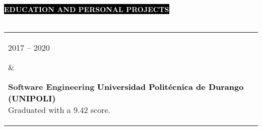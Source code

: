 \documentclass[10pt,A4]{article}
\makeatletter
\newcounter{a}
\newcounter{b}
\newcounter{c}
\newcommand{\cvsection}[1] {
	\textcolor{white}{\MakeUppercase{\textbf{#1}}}
}
\newcommand{\cvsect}[1]{
	\colorbox{black}{{\cvsection{#1}}}\\\\%
}
\newenvironment{entrylist}{%
	\begin{tabular*}{\textwidth}[t]{@{\extracolsep{\fill}}ll}
	}{%
	\end{tabular*}
}
\newcommand{\entry}[4]{%
	\parbox[t]{3.5cm}{%
		#1%
	}%
	&\parbox[t]{14cm}{%
		\textbf{#2}%
		\hfill%
		{\footnotesize \textbf{\textcolor{black}{#3}}}\\%
		#4%
	}\\\\}
\makeatother
\begin{document}

	\cvsect{Education and Personal Projects}
	\begin{entrylist}
		\entry
		{2017 – 2020}
		{Software Engineering}
		{Universidad Politécnica de Durango (UNIPOLI)}
		{Graduated with a 9.42 score.}
		\entry
		{2020}
		{Seeds for the Future}
		{Huawei}
		{Part of the 20 candidates selected at National level for direct training on new technologies such as AI,
		Cloud Computing, Internet of Things, and 5G network by Huawei.}
		\entry
		{2019}
		{Lung Cancer Detection System with AI - Damai}
		{Universidad Politécnica de Durango (UNIPOLI)}
		{School project presented on Abu Dhabi (UAE) alongside +100 projects from around the world at Expo
		Science International}
	\end{entrylist}%
	
\end{document}

